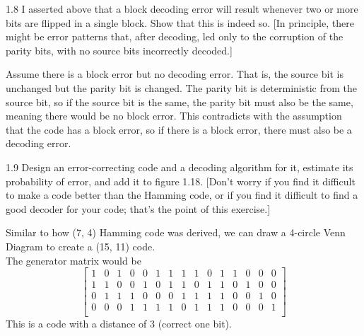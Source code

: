 \documentclass[12pt, a4paper]{article}
\begin{document}
\begin{prob}{1.8}
I asserted above that a block decoding error will result whenever two or more bits are flipped in a single block. Show that this is
indeed so. [In principle, there might be error patterns that, after decoding, led only to the corruption of the parity bits, with no source bits
incorrectly decoded.]
\end{prob}
\begin{sol}
Assume there is a block error but no decoding error. That is, the source bit is unchanged but the parity bit is changed.
The parity bit is deterministic from the source bit, so if the source bit is the same, the parity bit must also be the same, meaning there would be no block error.
This contradicts with the assumption that the code has a block error, so if there is a block error, there must also be a decoding error.
\end{sol}
\bigskip

\begin{prob}{1.9}
Design an error-correcting code and a decoding algorithm for it, estimate its probability of error, and add it to figure 1.18. [Don’t
worry if you find it difficult to make a code better than the Hamming
code, or if you find it difficult to find a good decoder for your code; that’s
the point of this exercise.]
\end{prob}
\begin{sol}
Similar to how (7, 4) Hamming code was derived, we can draw a 4-circle Venn Diagram to create a (15, 11) code. \\
The generator matrix would be 
\[
\left[
\begin{array}{ccccccccccccccc}
        1 & 0 & 1 & 0 & 0 & 1 & 1 & 1 & 1 & 0 & 1 & 1 & 0 & 0 & 0 \\
        1 & 1 & 0 & 0 & 1 & 0 & 1 & 1 & 0 & 1 & 1 & 0 & 1 & 0 & 0 \\
        0 & 1 & 1 & 1 & 0 & 0 & 0 & 1 & 1 & 1 & 1 & 0 & 0 & 1 & 0 \\
        0 & 0 & 0 & 1 & 1 & 1 & 1 & 0 & 1 & 1 & 1 & 0 & 0 & 0 & 1 \\
\end{array}
\right]
\]
This is a code with a distance of 3 (correct one bit).
\end{sol}
\bigskip
\end{document}
